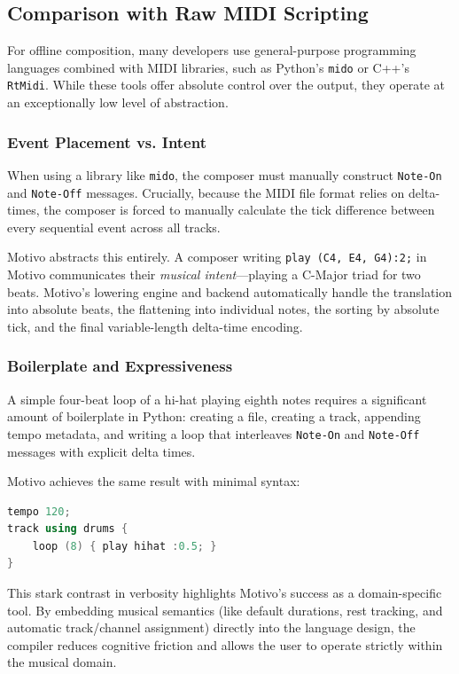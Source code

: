 \subsection{Comparison with Raw MIDI Scripting}\label{detail-subsec:comparison-with-raw-midi-scripting}

For offline composition, many developers use general-purpose programming languages combined with MIDI libraries, such as
Python's \texttt{mido} or C++'s \texttt{RtMidi}.
While these tools offer absolute control over the output, they operate at an exceptionally low level of abstraction.

\subsubsection{Event Placement vs. Intent}
When using a library like \texttt{mido}, the composer must manually construct \texttt{Note-On} and \texttt{Note-Off}
messages.
Crucially, because the MIDI file format relies on delta-times, the composer is forced to manually calculate the tick
difference between every sequential event across all tracks.

Motivo abstracts this entirely.
A composer writing \texttt{play (C4, E4, G4):2;} in Motivo communicates their \textit{musical intent}---playing a
C-Major triad for two beats.
Motivo's lowering engine and backend automatically handle the translation into absolute beats, the flattening into
individual notes, the sorting by absolute tick, and the final variable-length delta-time encoding.

\subsubsection{Boilerplate and Expressiveness}
A simple four-beat loop of a hi-hat playing eighth notes requires a significant amount of boilerplate in Python:
creating a file, creating a track, appending tempo metadata, and writing a loop that interleaves \texttt{Note-On} and
\texttt{Note-Off} messages with explicit delta times.

Motivo achieves the same result with minimal syntax:
\begin{lstlisting}[language=C++,label={detail-lst:lstlisting3}]
tempo 120;
track using drums {
    loop (8) { play hihat :0.5; }
}
\end{lstlisting}

This stark contrast in verbosity highlights Motivo's success as a domain-specific tool.
By embedding musical semantics (like default durations, rest tracking, and automatic track/channel assignment) directly
into the language design, the compiler reduces cognitive friction and allows the user to operate strictly within the
musical domain.
